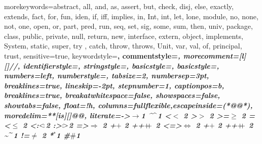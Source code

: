 {morekeywords={abstract, all, and, as, assert, but, check, disj, else, exactly, extends, fact, for, fun, iden, if, iff, implies, in, Int, int, let, lone, module, no, none, not, one, open, or, part, pred, run, seq, set, sig, some, sum, then, univ, package, class, public, private, null, return, new, interface, extern, object, implements, System, static, super, try , catch, throw, throws, Unit, var, val, of, principal, trust},
sensitive=true,
keywordstyle=\bfseries\color{green!40!black},
commentstyle=\itshape\color{purple!40!black},
morecomment=[l][\small\itshape\color{purple!40!black}]{//},
identifierstyle=\color{blue},
stringstyle=\color{orange},
basicstyle=\small,
basicstyle={\small\ttfamily},
numbers=left,
numberstyle=\tiny\color{mygray},
tabsize=2,
numbersep=3pt,
breaklines=true,
lineskip=-2pt,
stepnumber=1,
captionpos=b,
breaklines=true,
breakatwhitespace=false,
showspaces=false,
showtabs=false,
float=!h,
columns=fullflexible,escapeinside={(*@}{@*)},
moredelim=**[is][\color{red!60}]{@}{@},
literate={->}{{$\to$}}1 {^}{{$\mspace{-3mu}\widehat{\quad}\mspace{-3mu}$}}1
{<}{$<$ }2 {>}{$>$ }2 {>=}{$\geq$ }2 {=<}{$\leq$ }2
{<:}{{$<\mspace{-3mu}:$}}2 {:>}{{$:\mspace{-3mu}>$}}2
{=>}{{$\Rightarrow$ }}2 {+}{$+$ }2 {++}{{$+\mspace{-8mu}+$ }}2
{<=>}{{$\Leftrightarrow$ }}2 {+}{$+$ }2 {++}{{$+\mspace{-8mu}+$ }}2
{\~}{{$\mspace{-3mu}\widetilde{\quad}\mspace{-3mu}$}}1
{!=}{$\neq$ }2 {*}{${}^{\ast}$}1 %
{\#}{$\#$}1
}
\lstset{language=Java,numbersep=5pt,frame=single}

\DeclareMathOperator\niff{\ensuremath{\nLeftrightarrow}}
\DeclareMathOperator\nsimeq{\ensuremath{\mathrel{\not\simeq}}}
\DeclareMathOperator\nequiv{\ensuremath{\mathrel{\not\equiv}}}

\DeclareMathOperator\ceq{\ensuremath{\mathrel{\simeq_{{ctx}}}}}
\DeclareMathOperator\nceq{\mathrel{\nsimeq_{{ctx}}}}

\DeclareMathOperator\ceqs{\src{\ceq}}
\DeclareMathOperator\ceqt{\trgb{\ceq}}
\DeclareMathOperator\ceqo{\oth{\ceq}}
\DeclareMathOperator\ceqc{\com{\ceq}}

